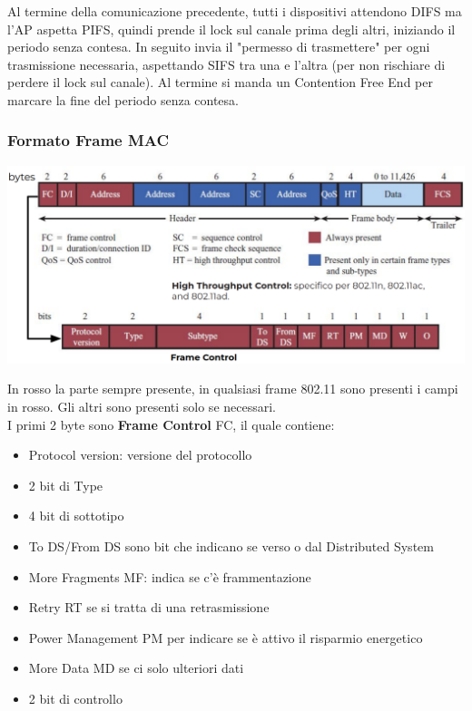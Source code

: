 Al termine della comunicazione precedente, tutti i dispositivi attendono DIFS ma l'AP aspetta PIFS, quindi prende il lock sul canale prima degli altri, iniziando il periodo senza contesa. In seguito invia il "permesso di trasmettere" per ogni trasmissione necessaria, aspettando SIFS tra una e l'altra (per non rischiare di perdere il lock sul canale). Al termine si manda un Contention Free End per marcare la fine del periodo senza contesa.\\


\subsubsection{Formato Frame MAC}
\begin{center}
	\includegraphics[width=0.9\linewidth]{img/wlan/macframe}
\end{center}
In rosso la parte sempre presente, in qualsiasi frame 802.11 sono presenti i campi in rosso. Gli altri sono presenti solo se necessari.\\

I primi 2 byte sono \textbf{Frame Control} FC, il quale contiene:
\begin{itemize}
	\item Protocol version: versione del protocollo
	\item 2 bit di Type
	\item 4 bit di sottotipo
	\item To DS/From DS sono bit che indicano se verso o dal Distributed System
	\item More Fragments MF: indica se c'è frammentazione
	\item Retry RT se si tratta di una retrasmissione
	\item Power Management PM per indicare se è attivo il risparmio energetico
	\item More Data MD se ci solo ulteriori dati
	\item 2 bit di controllo
\end{itemize}

